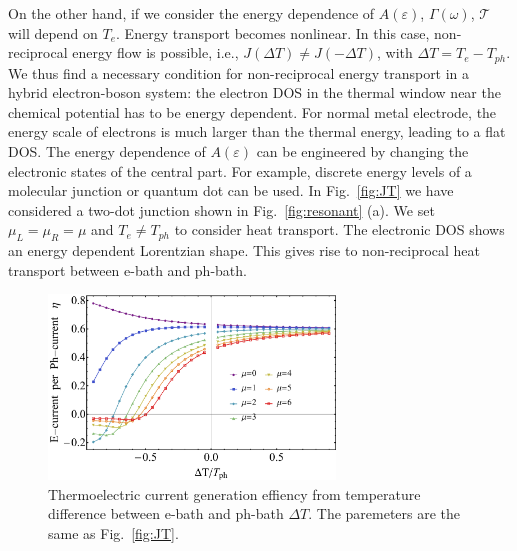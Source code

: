 \documentclass[aps,prb,
,floatfix,footinbib,shortbibliography,
preprint
]{revtex4-1}
\newcommand{\revision}[1]{{\color{blue}{#1}}}
\begin{document}
On the other hand, if we consider the energy dependence of $A(\varepsilon)$, $\Gamma(\omega)$, $\mathcal{T}^{}$ will depend on $T_e$. Energy transport becomes nonlinear. In this case, non-reciprocal energy flow is possible, i.e., $J(\Delta T)\neq J(-\Delta T)$, with $\Delta T=T_e-T_{ph}$. We thus find a necessary condition for non-reciprocal energy transport in a hybrid electron-boson system: the electron DOS in the thermal window near the chemical potential has to be energy dependent\cite{zhang2013thermal,ren2013heat}. For normal metal electrode, the energy scale of electrons is much larger than the thermal energy, leading to a flat DOS. The energy dependence of $A(\varepsilon)$ can be engineered by changing the electronic states of the central part. For example, discrete energy levels of a molecular junction or quantum dot can be used.
In Fig.~\ref{fig:JT} we have considered a two-dot junction shown in Fig.~\ref{fig:resonant} (a). We set $\mu_L=\mu_R=\mu$ and $T_e \neq T_{ph}$ to consider heat transport. The electronic DOS shows an energy dependent Lorentzian shape. This gives rise to non-reciprocal heat transport between e-bath and ph-bath. 








\begin{figure}[h]
	\includegraphics[width=3in,angle=0]{figures-0208/fig_4.pdf}	
	\caption{Thermoelectric current generation effiency from temperature difference between e-bath and ph-bath $\Delta T$. The paremeters are the same as Fig.~\ref{fig:JT}. }
	\label{fig:coldspot}
\end{figure}
\end{document}
